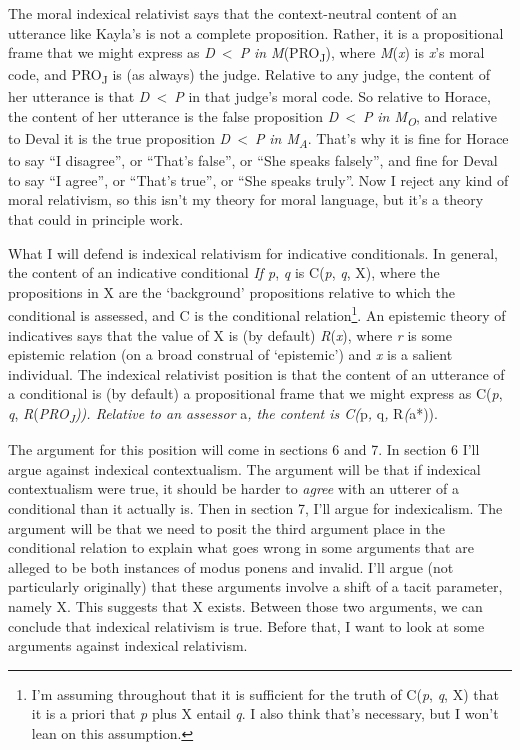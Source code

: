 \documentclass[
  10pt,
  letterpaper,
  DIV=11,
  numbers=noendperiod,
  twoside]{scrartcl}
\begin{document}
The moral indexical relativist says that the context-neutral content of
an utterance like Kayla's is not a complete proposition. Rather, it is a
propositional frame that we might express as \emph{D}~\textless~\emph{P}
\emph{in M}(PRO\textsubscript{J}), where \emph{M}(\emph{x}) is
\emph{x}'s moral code, and PRO\textsubscript{J} is (as always) the
judge. Relative to any judge, the content of her utterance is that
\emph{D}~\textless~\emph{P} in that judge's moral code. So relative to
Horace, the content of her utterance is the false proposition
\emph{D}~\textless~\emph{P} \emph{in M\textsubscript{O}}, and relative
to Deval it is the true proposition \emph{D}~\textless~\emph{P} \emph{in
M\textsubscript{A}}. That's why it is fine for Horace to say ``I
disagree'', or ``That's false'', or ``She speaks falsely'', and fine for
Deval to say ``I agree'', or ``That's true'', or ``She speaks truly''.
Now I reject any kind of moral relativism, so this isn't my theory for
moral language, but it's a theory that could in principle work.

What I will defend is indexical relativism for indicative conditionals.
In general, the content of an indicative conditional \emph{If p},
\emph{q} is C(\emph{p}, \emph{q}, X), where the propositions in X are
the `background' propositions relative to which the conditional is
assessed, and C is the conditional relation\footnote{I'm assuming
  throughout that it is sufficient for the truth of C(\emph{p},
  \emph{q}, X) that it is a priori that \emph{p} plus X entail \emph{q}.
  I also think that's necessary, but I won't lean on this assumption.}.
An epistemic theory of indicatives says that the value of X is (by
default) \emph{R}(\emph{x}), where \emph{r} is some epistemic relation
(on a broad construal of `epistemic') and \emph{x} is a salient
individual. The indexical relativist position is that the content of an
utterance of a conditional is (by default) a propositional frame that we
might express as C(\emph{p}, \emph{q},
\emph{R}(\emph{PRO\textsubscript{J})). Relative to an assessor }a\emph{,
the content is C(}p\emph{, }q\emph{, }R\emph{(}a*)).

The argument for this position will come in sections 6 and 7. In section
6 I'll argue against indexical contextualism. The argument will be that
if indexical contextualism were true, it should be harder to
\emph{agree} with an utterer of a conditional than it actually is. Then
in section 7, I'll argue for indexicalism. The argument will be that we
need to posit the third argument place in the conditional relation to
explain what goes wrong in some arguments that are alleged to be both
instances of modus ponens and invalid. I'll argue (not particularly
originally) that these arguments involve a shift of a tacit parameter,
namely X. This suggests that X exists. Between those two arguments, we
can conclude that indexical relativism is true. Before that, I want to
look at some arguments against indexical relativism.
\end{document}
